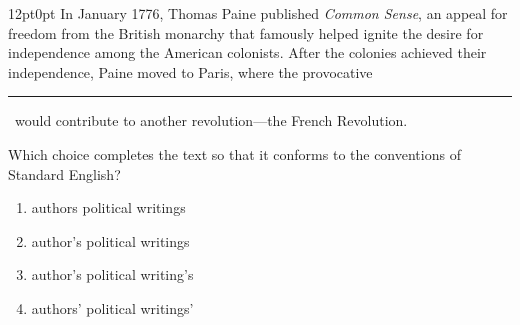 \documentclass[11pt, twocolumn]{article}
\newcounter{questionnum}
\begin{document}
\vspace{6pt}\noindent
\begin{minipage}{\columnwidth}\raggedright
\noindent{}\par\vspace{8pt}
\begin{adjustwidth}{12pt}{0pt}
In January 1776, Thomas Paine published \textit{Common Sense}, an appeal for freedom from the British monarchy that famously helped ignite the desire for independence among the American colonists. After the colonies achieved their independence, Paine moved to Paris, where the provocative \,\rule{2cm}{0.4pt}\, would contribute to another revolution---the French Revolution.
\vspace{6pt}

Which choice completes the text so that it conforms to the conventions of Standard English?
\begin{enumerate}[label=\Alph*),leftmargin=18pt,topsep=3pt,itemsep=2pt]
  \item authors political writings
  \item author's political writings
  \item author's political writing's
  \item authors' political writings'
\end{enumerate}
\end{adjustwidth}
\end{minipage}\par
\end{document}
